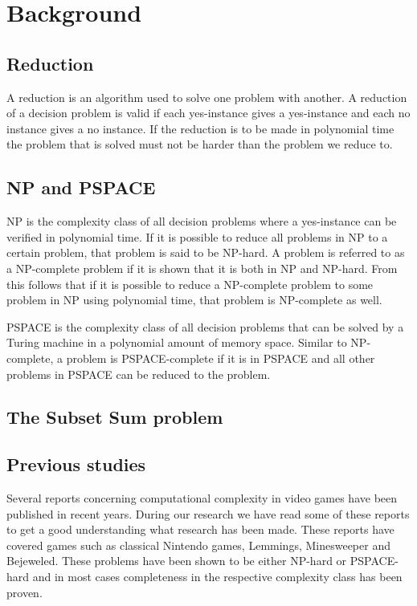 \section{Background}

\subsection{Reduction}
A reduction is an algorithm used to solve one problem with another. A reduction of a decision problem is valid if each yes-instance gives a yes-instance and each no instance gives a no instance. If the reduction is to be made in polynomial time the problem that is solved must not be harder than the problem we reduce to. 

\subsection{NP and PSPACE}
NP is the complexity class of all decision problems where a yes-instance can be verified in polynomial time. If it is possible to reduce all problems in NP to a certain problem, that problem is said to be NP-hard. A problem is referred to as a NP-complete problem if it is shown that it is both in NP and NP-hard. From this follows that if it is possible to reduce a NP-complete problem to some problem in NP using polynomial time, that problem is NP-complete as well.

PSPACE is the complexity class of all decision problems that can be solved by a Turing machine in a polynomial amount of memory space. Similar to NP-complete, a problem is PSPACE-complete if it is in PSPACE and all other problems in PSPACE can be reduced to the problem.

\subsection{The Subset Sum problem}

\subsection{Previous studies}

Several reports concerning computational complexity in video games have been published in recent years. During our research we have read some of these reports to get a good understanding what research has been made. These reports have covered games such as classical Nintendo games, Lemmings, Minesweeper and Bejeweled. These problems have been shown to be either NP-hard or PSPACE-hard and in most cases completeness in the respective complexity class has been proven.

